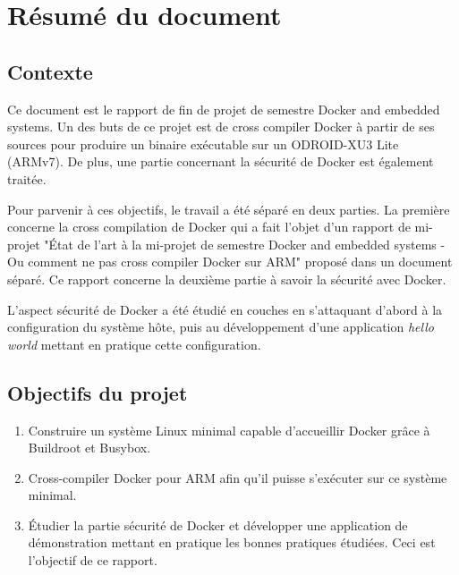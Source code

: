 \documentclass[11pt,a4paper,oneside]{report}
\newcommand{\oldreportname}{État de l’art à la mi-projet de semestre Docker and embedded systems - Ou comment ne pas cross compiler Docker sur ARM}
\newcommand{\odroid}{ODROID-XU3 Lite }
\begin{document}
\pagestyle{historystyle}
\begin{versionhistory}
\end{versionhistory}


\chapter{Résumé du document}
\section{Contexte}
Ce document est le rapport de fin de projet de semestre Docker and embedded systems. Un des buts de ce projet est de cross compiler Docker à partir de ses sources pour produire un binaire exécutable sur un \odroid (ARMv7). De plus, une partie concernant la sécurité de Docker est également traitée.

Pour parvenir à ces objectifs, le travail a été séparé en deux parties. La première concerne la cross compilation de Docker qui a fait l'objet d'un rapport de mi-projet "\oldreportname" proposé dans un document séparé. Ce rapport concerne la deuxième partie à savoir la sécurité avec Docker.

L'aspect sécurité de Docker a été étudié en couches en s'attaquant d'abord à la configuration du système hôte, puis au développement d'une application \textit{hello world} mettant en pratique cette configuration.


\section{Objectifs du projet}
\begin{enumerate}
\item Construire un système Linux minimal capable d'accueillir Docker grâce à Buildroot et Busybox.

\item Cross-compiler Docker pour ARM afin qu'il puisse s'exécuter sur ce système minimal.

\item Étudier la partie sécurité de Docker et développer une application de démonstration mettant en pratique les bonnes pratiques étudiées. Ceci est l'objectif de ce rapport.
\end{enumerate}
\end{document}
